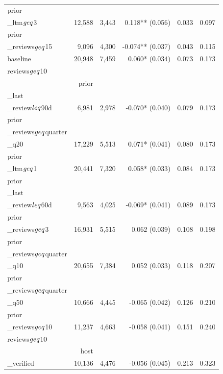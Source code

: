 \begin{table}[!htbp]
\begin{tabular}{lrrrrr}
prior\\_ltm$\\geq$3 & 12,588 & 3,443 & 0.118** (0.056) & 0.033 & 0.097 \\
prior\\_reviews$\\geq$15 & 9,096 & 4,300 & -0.074** (0.037) & 0.043 & 0.115 \\
baseline & 20,948 & 7,459 & 0.060* (0.034) & 0.073 & 0.173 \\
reviews$\\geq$10 \\& prior\\_last\\_review$\\leq$90d & 6,981 & 2,978 & -0.070* (0.040) & 0.079 & 0.173 \\
prior\\_reviews$\\geq$quarter\\_q20 & 17,229 & 5,513 & 0.071* (0.041) & 0.080 & 0.173 \\
prior\\_ltm$\\geq$1 & 20,441 & 7,320 & 0.058* (0.033) & 0.084 & 0.173 \\
prior\\_last\\_review$\\leq$60d & 9,563 & 4,025 & -0.069* (0.041) & 0.089 & 0.173 \\
prior\\_reviews$\\geq$3 & 16,931 & 5,515 & 0.062 (0.039) & 0.108 & 0.198 \\
prior\\_reviews$\\geq$quarter\\_q10 & 20,655 & 7,384 & 0.052 (0.033) & 0.118 & 0.207 \\
prior\\_reviews$\\geq$quarter\\_q50 & 10,666 & 4,445 & -0.065 (0.042) & 0.126 & 0.210 \\
prior\\_reviews$\\geq$10 & 11,237 & 4,663 & -0.058 (0.041) & 0.151 & 0.240 \\
reviews$\\geq$10 \\& host\\_verified & 10,136 & 4,476 & -0.056 (0.045) & 0.213 & 0.323 \\

\end{tabular}
\end{table}
